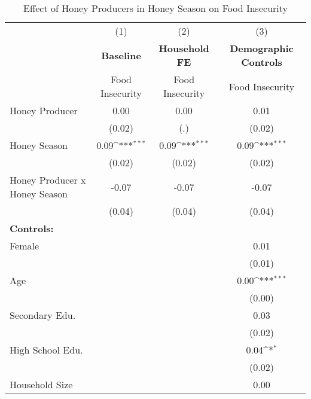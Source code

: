 \begin{table}[htbp]\centering \small
\def\sym#1{\ifmmode^{#1}\else\(^{#1}\)\fi}
\caption{Effect of Honey Producers in Honey Season on Food Insecurity \label{DiD}}
\begin{tabular}{l*{3}{c}}
\toprule
                &\multicolumn{1}{c}{(1)}&\multicolumn{1}{c}{(2)}&\multicolumn{1}{c}{(3)}\\
                &\multicolumn{1}{c}{  \textbf{Baseline}  }&\multicolumn{1}{c}{\textbf{Household FE}}&\multicolumn{1}{c}{ \textbf{Demographic Controls}}\\
                &Food Insecurity         &Food Insecurity         &Food Insecurity         \\
\midrule
Honey Producer  &     0.00         &     0.00         &     0.01         \\
                &   (0.02)         &      (.)         &   (0.02)         \\
Honey Season    &     0.09\sym{***}&     0.09\sym{***}&     0.09\sym{***}\\
                &   (0.02)         &   (0.02)         &   (0.02)         \\
Honey Producer x Honey Season&    -0.07         &    -0.07         &    -0.07         \\
                &   (0.04)         &   (0.04)         &   (0.04)         \\
\textbf{Controls:}&                  &                  &                  \\
Female          &                  &                  &     0.01         \\
                &                  &                  &   (0.01)         \\
Age             &                  &                  &     0.00\sym{***}\\
                &                  &                  &   (0.00)         \\
Secondary Edu.  &                  &                  &     0.03         \\
                &                  &                  &   (0.02)         \\
High School Edu.&                  &                  &     0.04\sym{*}  \\
                &                  &                  &   (0.02)         \\
Household Size  &                  &                  &     0.00         \\

\end{tabular}
\end{table}

